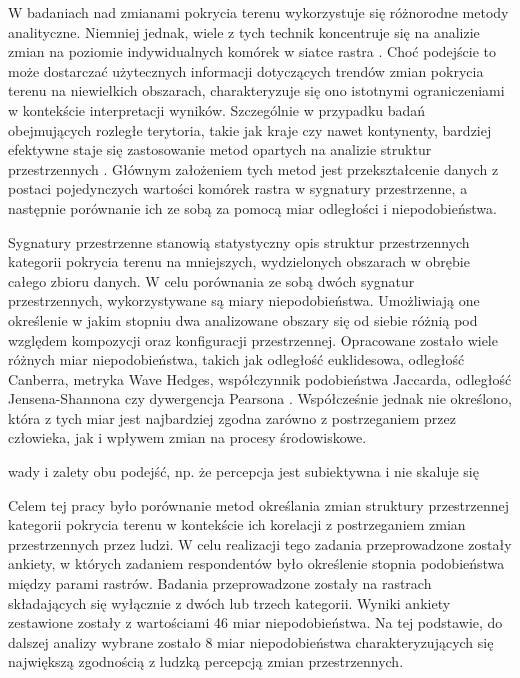 \documentclass{amuthesis}
\begin{document}
W badaniach nad zmianami pokrycia terenu wykorzystuje się różnorodne
metody analityczne. Niemniej jednak, wiele z tych technik koncentruje
się na analizie zmian na poziomie indywidualnych komórek w siatce rastra
\autocite{ChangeDetectionTechniques}. Choć podejście to może dostarczać
użytecznych informacji dotyczących trendów zmian pokrycia terenu na
niewielkich obszarach, charakteryzuje się ono istotnymi ograniczeniami w
kontekście interpretacji wyników. Szczególnie w przypadku badań
obejmujących rozległe terytoria, takie jak kraje czy nawet kontynenty,
bardziej efektywne staje się zastosowanie metod opartych na analizie
struktur przestrzennych \autocite{Netzel2015}. Głównym założeniem tych
metod jest przekształcenie danych z postaci pojedynczych wartości
komórek rastra w sygnatury przestrzenne, a następnie porównanie ich ze
sobą za pomocą miar odległości i niepodobieństwa.

Sygnatury przestrzenne stanowią statystyczny opis struktur
przestrzennych kategorii pokrycia terenu na mniejszych, wydzielonych
obszarach w obrębie całego zbioru danych. W celu porównania ze sobą
dwóch sygnatur przestrzennych, wykorzystywane są miary niepodobieństwa.
Umożliwiają one określenie w jakim stopniu dwa analizowane obszary się
od siebie różnią pod względem kompozycji oraz konfiguracji
przestrzennej. Opracowane zostało wiele różnych miar niepodobieństwa,
takich jak odległość euklidesowa, odległość Canberra, metryka Wave
Hedges, współczynnik podobieństwa Jaccarda, odległość Jensena-Shannona
czy dywergencja Pearsona \autocite{Cha2007}. Współcześnie jednak nie
określono, która z tych miar jest najbardziej zgodna zarówno z
postrzeganiem przez człowieka, jak i wpływem zmian na procesy
środowiskowe.

wady i zalety obu podejść, np. że percepcja jest subiektywna i nie
skaluje się

Celem tej pracy było porównanie metod określania zmian struktury
przestrzennej kategorii pokrycia terenu w kontekście ich korelacji z
postrzeganiem zmian przestrzennych przez ludzi. W celu realizacji tego
zadania przeprowadzone zostały ankiety, w których zadaniem respondentów
było określenie stopnia podobieństwa między parami rastrów. Badania
przeprowadzone zostały na rastrach składających się wyłącznie z dwóch
lub trzech kategorii. Wyniki ankiety zestawione zostały z wartościami 46
miar niepodobieństwa. Na tej podstawie, do dalszej analizy wybrane
zostało 8 miar niepodobieństwa charakteryzujących się największą
zgodnością z ludzką percepcją zmian przestrzennych.
\end{document}
